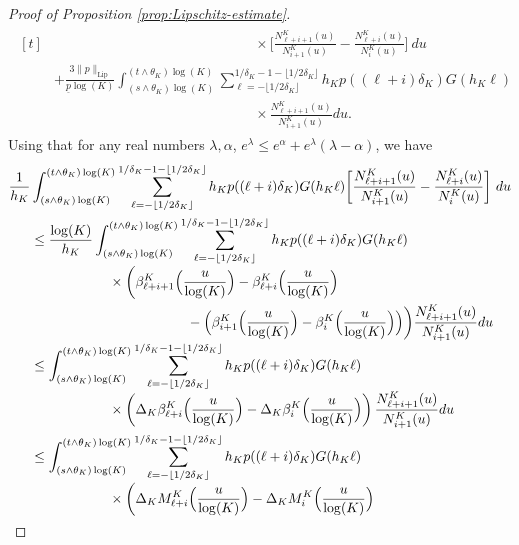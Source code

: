 \documentclass[10pt]{amsart}
\theoremstyle{plain}
\theoremstyle{remark}
\begin{document}
\begin{proof}[Proof of Proposition \ref{prop:Lipschitz-estimate}]
{\begin{multline*}
\begin{aligned}[t]
& \hspace{6cm}\times \biggl[\frac{N_{\ell+i+1}^K(u)}{N_{i+1}^K(u)}-\frac{N_{\ell+i}^K(u)}{N_{i}^K(u)}
\biggr]\ du \\
& +\frac{{3}\|p\|_{\text{Lip}}}{\underline{p}\log(K)}\int_{(s\wedge\theta_K)\log(K)}^{(t\wedge\theta_K)\log(K)} \sum_{\ell=-\lfloor 1/2\delta_K\rfloor}^{1/\delta_K-1-\lfloor 1/2\delta_K\rfloor} h_Kp((\ell+i)\delta_K)G(h_K\ell)\\
& \hspace{6cm} \times \frac{N_{\ell+i+1}^K(u)}{N_{i+1}^K(u)}du.
\end{aligned}
\end{multline*}
Using that for any real numbers $\lambda,\alpha$, $e^\lambda\le e^\alpha+ e^\lambda(\lambda-\alpha)$, we have
\begin{align*}
\frac{1}{h_K}&\int_{(s\wedge\theta_K)\log(K)}^{(t\wedge\theta_K)\log(K)} \sum_{\ell=-\lfloor 1/2\delta_K\rfloor}^{1/\delta_K-1-\lfloor 1/2\delta_K\rfloor} h_Kp((\ell+i)\delta_K)G(h_K\ell)\biggl[\frac{N_{\ell+i+1}^K(u)}{N_{i+1}^K(u)}-\frac{N_{\ell+i}^K(u)}{N_{i}^K(u)}
\biggr]\ du
\\
& \leq \frac{\log(K)}{ h_K}\int_{(s\wedge\theta_K)\log(K)}^{(t\wedge\theta_K)\log(K)} \sum_{\ell=-\lfloor 1/2\delta_K\rfloor}^{1/\delta_K-1-\lfloor 1/2\delta_K\rfloor} h_Kp((\ell+i)\delta_K)G(h_K\ell) \\[-3pt]
& \hspace{2cm}\times \biggl(\beta^K_{\ell+i+1}\Bigl(\frac{u}{\log(K)}\Bigr)-\beta^K_{\ell+i}\Bigl(\frac{u}{\log(K)}\Bigr)\\
& \hspace{4cm} -\Bigl(\beta^K_{i+1}\Bigl(\frac{u}{\log(K)}\Bigr)-\beta^K_i\Bigl(\frac{u}{\log(K)}\Bigr)\Bigl)\biggr) \frac{N^K_{\ell+i+1}(u)}{N^K_{i+1}(u)}du \\[-3pt]
& \leq \int_{(s\wedge\theta_K)\log(K)}^{(t\wedge\theta_K)\log(K)} \sum_{\ell=-\lfloor 1/2\delta_K\rfloor}^{1/\delta_K-1-\lfloor 1/2\delta_K\rfloor} h_Kp((\ell+i)\delta_K)G(h_K\ell)\\[-3pt]
& \hspace*{2cm}\times\left(\Delta_K\beta^K_{\ell+i}\Bigl(\frac{u}{\log(K)}\Bigr)-\Delta_K\beta^K_{i}\Bigl(\frac{u}{\log(K)}\Bigr)\right)
\frac{N^K_{\ell+i+1}(u)}{N^K_{i+1}(u)}du \\
&\leq \int_{(s\wedge\theta_K)\log(K)}^{(t\wedge\theta_K)\log(K)} \sum_{\ell=-\lfloor 1/2\delta_K\rfloor}^{1/\delta_K-1-\lfloor 1/2\delta_K\rfloor} h_Kp((\ell+i)\delta_K)G(h_K\ell)\\[-3pt]
& \hspace{2cm} \times\biggl(\Delta_KM^K_{\ell+i}\Bigl(\frac{u}{\log(K)}\Bigr)-\Delta_KM^K_{i}\Bigl(\frac{u}{\log(K)}\Bigr) \\[-3pt]

\end{align*}}
\end{proof}
\end{document}
